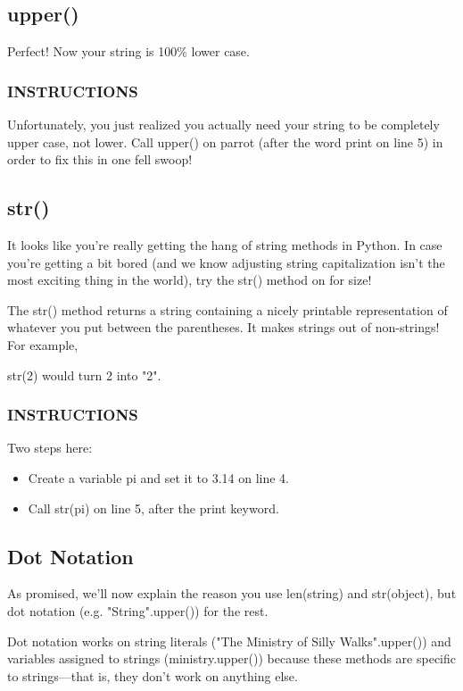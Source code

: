 \documentclass[12pt,a4paper,final,twoside,onecolumn,titlepage]{book}
\begin{document}
\subsection{upper()}
Perfect! Now your string is 100\% lower case.

\subsubsection{INSTRUCTIONS}
Unfortunately, you just realized you actually need your string to be completely upper case, not lower. Call upper() on parrot (after the word print on line 5) in order to fix this in one fell swoop!

\subsection{str()}
It looks like you're really getting the hang of string methods in Python. In case you're getting a bit bored (and we know adjusting string capitalization isn't the most exciting thing in the world), try the str() method on for size!

The str() method returns a string containing a nicely printable representation of whatever you put between the parentheses. It makes strings out of non-strings! For example,

str(2)
would turn 2 into "2".

\subsubsection{INSTRUCTIONS}
Two steps here:
\begin{itemize}
\item Create a variable pi and set it to 3.14 on line 4.
\item Call str(pi) on line 5, after the print keyword.
\end{itemize}

\subsection{Dot Notation}
As promised, we'll now explain the reason you use len(string) and str(object), but dot notation (e.g. "String".upper()) for the rest.

Dot notation works on string literals ("The Ministry of Silly Walks".upper()) and variables assigned to strings (ministry.upper()) because these methods are specific to strings—that is, they don't work on anything else.
\end{document}
